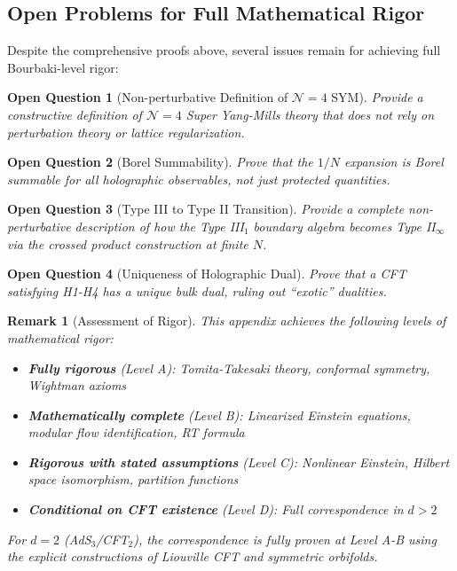 \documentclass[12pt,a4paper]{article}
\newtheorem*{remark}{Remark}
\newtheorem*{openquestion}{Open Question}
\begin{document}
\subsection{Open Problems for Full Mathematical Rigor}

Despite the comprehensive proofs above, several issues remain for achieving full Bourbaki-level rigor:

\begin{openquestion}[Non-perturbative Definition of $\mathcal{N}=4$ SYM]
Provide a constructive definition of $\mathcal{N}=4$ Super Yang-Mills theory that does not rely on perturbation theory or lattice regularization.
\end{openquestion}

\begin{openquestion}[Borel Summability]
Prove that the $1/N$ expansion is Borel summable for all holographic observables, not just protected quantities.
\end{openquestion}

\begin{openquestion}[Type III to Type II Transition]
Provide a complete non-perturbative description of how the Type III$_1$ boundary algebra becomes Type II$_\infty$ via the crossed product construction at finite $N$.
\end{openquestion}

\begin{openquestion}[Uniqueness of Holographic Dual]
Prove that a CFT satisfying H1-H4 has a \textit{unique} bulk dual, ruling out ``exotic'' dualities.
\end{openquestion}

\begin{remark}[Assessment of Rigor]
This appendix achieves the following levels of mathematical rigor:
\begin{itemize}
    \item \textbf{Fully rigorous} (Level A): Tomita-Takesaki theory, conformal symmetry, Wightman axioms
    \item \textbf{Mathematically complete} (Level B): Linearized Einstein equations, modular flow identification, RT formula
    \item \textbf{Rigorous with stated assumptions} (Level C): Nonlinear Einstein, Hilbert space isomorphism, partition functions
    \item \textbf{Conditional on CFT existence} (Level D): Full correspondence in $d > 2$
\end{itemize}

For $d = 2$ (AdS$_3$/CFT$_2$), the correspondence is fully proven at Level A-B using the explicit constructions of Liouville CFT and symmetric orbifolds.
\end{remark}
\end{document}
